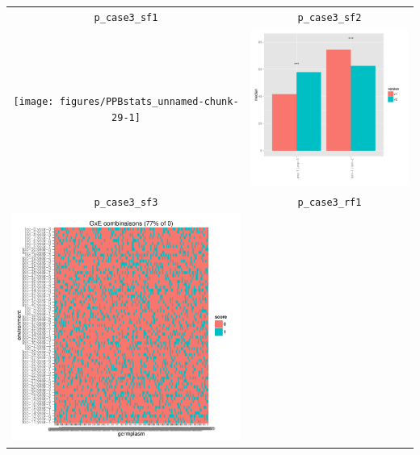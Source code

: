 \documentclass{article}\usepackage[]{graphicx}\usepackage[]{color}
\newenvironment{knitrout}{}{} %
\begin{document}
\begin{center}
\begin{tabular}{cc}
\texttt{p\_case3\_sf1} & \texttt{p\_case3\_sf2} \\
\begin{knitrout}
\definecolor{shadecolor}{rgb}{0.969, 0.969, 0.969}\color{fgcolor}

{\centering \texttt{[image: figures/PPBstats\_unnamed-chunk-29-1]} 

}



\end{knitrout}
&
\begin{knitrout}
\definecolor{shadecolor}{rgb}{0.969, 0.969, 0.969}\color{fgcolor}

{\centering \includegraphics[width=.4\textwidth]{figures/PPBstats_unnamed-chunk-30-1} 

}



\end{knitrout}
\\
\texttt{p\_case3\_sf3} & \texttt{p\_case3\_rf1} \\
\begin{knitrout}
\definecolor{shadecolor}{rgb}{0.969, 0.969, 0.969}\color{fgcolor}

{\centering \includegraphics[width=.4\textwidth]{figures/PPBstats_unnamed-chunk-31-1} 

}




\end{knitrout}
\end{tabular}
\end{center}
\end{document}
